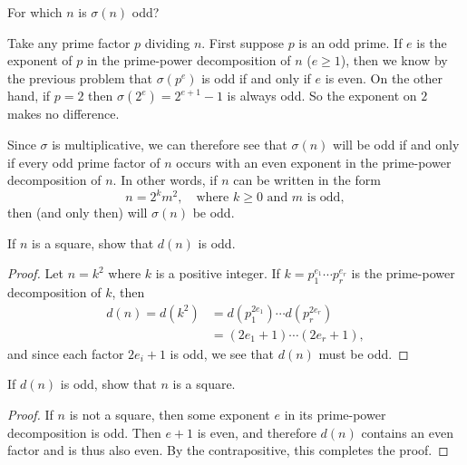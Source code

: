  For which $n$ is $\sigma(n)$ odd?
\begin{solution}
  Take any prime factor $p$ dividing $n$. First suppose $p$ is an odd
  prime. If $e$ is the exponent of $p$ in the prime-power
  decomposition of $n$ ($e\geq1$), then we know by the previous
  problem that $\sigma(p^e)$ is odd if and only if $e$ is even. On the
  other hand, if $p = 2$ then $\sigma(2^e) = 2^{e+1} - 1$ is always
  odd. So the exponent on $2$ makes no difference.

  Since $\sigma$ is multiplicative, we can therefore see that
  $\sigma(n)$ will be odd if and only if every odd prime factor of $n$
  occurs with an even exponent in the prime-power decomposition of
  $n$. In other words, if $n$ can be written in the form
  \begin{equation*}
    n = 2^km^2, \quad\text{where $k\geq0$ and $m$ is odd},
  \end{equation*}
  then (and only then) will $\sigma(n)$ be odd.
\end{solution}

 If $n$ is a square, show that $d(n)$ is odd.
\begin{proof}
  Let $n = k^2$ where $k$ is a positive integer. If
  $k = p_1^{e_1}\cdots p_r^{e_r}$ is the prime-power decomposition of
  $k$, then
  \begin{align*}
    d(n) = d(k^2) &= d(p_1^{2e_1})\cdots d(p_r^{2e_r}) \\
                  &= (2e_1 + 1)\cdots(2e_r + 1),
  \end{align*}
  and since each factor $2e_i + 1$ is odd, we see that $d(n)$ must be
  odd.
\end{proof}

 If $d(n)$ is odd, show that $n$ is a square.
\begin{proof}
  If $n$ is not a square, then some exponent $e$ in its prime-power
  decomposition is odd. Then $e + 1$ is even, and therefore $d(n)$
  contains an even factor and is thus also even. By the
  contrapositive, this completes the proof.
\end{proof}
